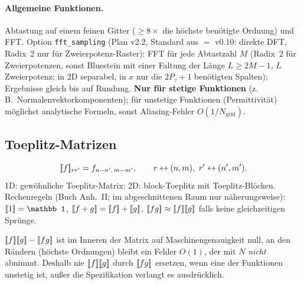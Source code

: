 \paragraph{Allgemeine Funktionen.} Abtastung auf einem feinen Gitter ($\ge 8\times$ die höchste
benötigte Ordnung) und FFT. Option \verb|fft_sampling| (Plan v2.2, Standard aus $=$ v0.10: direkte DFT, Radix~2
nur für Zweierpotenz-Raster): FFT für jede Abtastzahl $M$ (Radix~2 für Zweierpotenzen, sonst Bluestein mit
einer Faltung der Länge $L\ge2M-1$, $L$ Zweierpotenz; in 2D separabel, in $x$ nur die $2P_z+1$ benötigten
Spalten); Ergebnisse gleich bis auf Rundung. \textbf{Nur für stetige Funktionen} (z.\,B.\ Normalenvektorkomponenten);
für unstetige Funktionen (Permittivität) möglichst analytische Formeln, sonst Aliasing-Fehler
$O(1/N_{\text{grid}})$.

\subsection{Toeplitz-Matrizen}
\begin{equation}
  [\![f]\!]_{rr'}=f_{n-n',\,m-m'},\qquad r\leftrightarrow(n,m),\ r'\leftrightarrow(n',m').
  \label{eq:toeplitz}
\end{equation}
1D: gewöhnliche Toeplitz-Matrix; 2D: block-Toeplitz mit Toeplitz-Blöcken. Rechenregeln
(Buch Anh.~II; im abgeschnittenen Raum nur näherungsweise):
$\tp{1}=\mathbb 1$, $[\![f+g]\!]=[\![f]\!]+[\![g]\!]$, $[\![fg]\!]\approx[\![f]\!][\![g]\!]$ falls keine gleichzeitigen Sprünge.
\begin{tcolorbox}[title=Numerischer Befund (Kapitelprüfung)]
$[\![f]\!][\![g]\!]-[\![fg]\!]$ ist im Inneren der Matrix auf Maschinengenauigkeit null, an den Rändern
(höchste Ordnungen) bleibt ein Fehler $O(1)$, der mit $N$ \emph{nicht} abnimmt. Deshalb nie
$[\![f]\!][\![g]\!]$ durch $[\![fg]\!]$ ersetzen, wenn eine der Funktionen unstetig ist, außer die Spezifikation
verlangt es ausdrücklich.
\end{tcolorbox}
